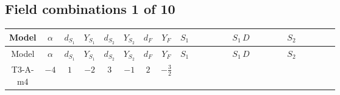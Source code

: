 \documentclass[8pt]{article}
\begin{document}
\begin{landscape}
\subsection*{Field combinations 1 of 10}
\begin{longtable}{@{}cccccccc >{\raggedright\arraybackslash}p{0.21\linewidth} >{\raggedright\arraybackslash}p{0.21\linewidth} >{\raggedright\arraybackslash}p{0.21\linewidth}@{}}
\toprule
Model & $\alpha$ & $d_{S_1}$ & $Y_{S_1}$ & $d_{S_2}$ & $Y_{S_2}$ & $d_F$ & $Y_F$ & $S_1$ & $S_1\,D$ & $S_2$ \\
\midrule
\endfirsthead
\toprule
Model & $\alpha$ & $d_{S_1}$ & $Y_{S_1}$ & $d_{S_2}$ & $Y_{S_2}$ & $d_F$ & $Y_F$ & $S_1$ & $S_1\,D$ & $S_2$ \\
\midrule
\endhead
T3-A-m4 & $-4$ & $1$ & $-2$ & $3$ & $-1$ & $2$ & $-\frac{3}{2}$ & \scriptsize\adjustbox{max width=\linewidth}{$\begin{gathered} -\frac{2 \hbar  \overline{y_{1,i_1,r_1}} \overline{y_{1,i_2,r_2}} S_1^2 y_{1,i_1,r_2} y_{1,i_2,r_1} \left(S_1{}^{\dagger }\right){}^2}{\epsilon } \\ -C_{S_1^\dagger S_1} S_1 S_1{}^{\dagger } \\ +C_{S_1^\dagger S_1} \hbar  \overline{y_{1,i_1,r_1}} S_1 y_{1,i_1,r_1} S_1{}^{\dagger }\end{gathered}$} & \scriptsize\adjustbox{max width=\linewidth}{$\begin{gathered} +D_{\mu _1}\left(S_1\right){}^{\dagger } D_{\mu _1}\left(S_1\right)\end{gathered}$} & \scriptsize\adjustbox{max width=\linewidth}{$\begin{gathered} +\frac{2 \hbar  \overline{y_{2,i_1,r_1}} \overline{y_{2,i_2,r_2}} S_{2,j_2}^2 y_{2,i_1,r_2} y_{2,i_2,r_1} \left(S_{2,j_1}{}^{\dagger }\right){}^2}{3 \epsilon } \\ -C_{S_2^\dagger S_2} S_{2,j_1} S_{2,j_1}{}^{\dagger } \\ +\frac{C_{S_2^\dagger S_2} \hbar  \overline{y_{2,i_1,r_1}} S_{2,j_1} y_{2,i_1,r_1} S_{2,j_1}{}^{\dagger }}{\sqrt{3}}\end{gathered}$} \\

\end{longtable}
\end{landscape}
\end{document}
